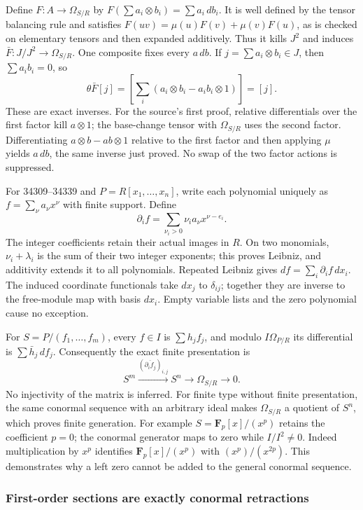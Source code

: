 Define \(F:A\to\Omega_{S/R}\) by \(F(\sum a_i\otimes b_i)=\sum a_i\,db_i\). It is well defined by the tensor balancing rule and satisfies \(F(uv)=\mu(u)F(v)+\mu(v)F(u)\), as is checked on elementary tensors and then expanded additively. Thus it kills \(J^2\) and induces \(\bar F:J/J^2\to\Omega_{S/R}\). One composite fixes every \(a\,db\). If \(j=\sum a_i\otimes b_i\in J\), then \(\sum a_ib_i=0\), so \[
\theta\bar F[j]=\left[\sum_i(a_i\otimes b_i-a_ib_i\otimes1)\right]=[j].
\] These are exact inverses. For the source's first proof, relative differentials over the first factor kill \(a\otimes1\); the base-change tensor with \(\Omega_{S/R}\) uses the second factor. Differentiating \(a\otimes b-ab\otimes1\) relative to the first factor and then applying \(\mu\) yields \(a\,db\), the same inverse just proved. No swap of the two factor actions is suppressed.

For 34309--34339 and \(P=R[x_1,\ldots,x_n]\), write each polynomial uniquely as \(f=\sum_\nu a_\nu x^\nu\) with finite support. Define \[
\partial_i f=\sum_{\nu_i>0}\nu_i a_\nu x^{\nu-e_i}.
\] The integer coefficients retain their actual images in \(R\). On two monomials, \(\nu_i+\lambda_i\) is the sum of their two integer exponents; this proves Leibniz, and additivity extends it to all polynomials. Repeated Leibniz gives \(df=\sum_i\partial_i f\,dx_i\). The induced coordinate functionals take \(dx_j\) to \(\delta_{ij}\); together they are inverse to the free-module map with basis \(dx_i\). Empty variable lists and the zero polynomial cause no exception.

For \(S=P/(f_1,\ldots,f_m)\), every \(f\in I\) is \(\sum h_jf_j\), and modulo \(I\Omega_{P/R}\) its differential is \(\sum\bar h_j\,df_j\). Consequently the exact finite presentation is \[
S^m\xrightarrow{(\overline{\partial_i f_j})_{i,j}}S^n\longrightarrow\Omega_{S/R}\longrightarrow0.
\] No injectivity of the matrix is inferred. For finite type without finite presentation, the same conormal sequence with an arbitrary ideal makes \(\Omega_{S/R}\) a quotient of \(S^n\), which proves finite generation. For example \(S=\mathbf F_p[x]/(x^p)\) retains the coefficient \(p=0\); the conormal generator maps to zero while \(I/I^2\ne0\). Indeed multiplication by \(x^p\) identifies \(\mathbf F_p[x]/(x^p)\) with \((x^p)/(x^{2p})\). This demonstrates why a left zero cannot be added to the general conormal sequence.

\subsubsection{First-order sections are exactly conormal retractions}\label{first-order-sections-are-exactly-conormal-retractions}

